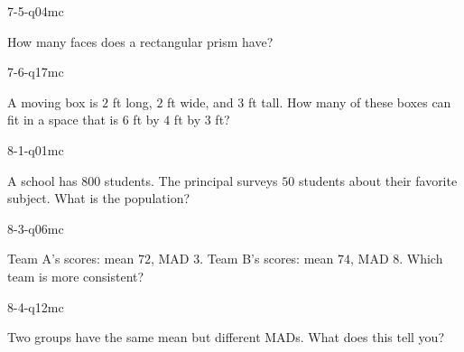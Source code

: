 \begin{practiceQuestion}{7-5-q04}{mc}
\begin{questionText}
How many faces does a rectangular prism have?
\end{questionText}
\end{practiceQuestion}

\begin{practiceQuestion}{7-6-q17}{mc}
\begin{questionText}
A moving box is $2$ ft long, $2$ ft wide, and $3$ ft tall. How many of these boxes can fit in a space that is $6$ ft by $4$ ft by $3$ ft?
\end{questionText}
\end{practiceQuestion}

\begin{practiceQuestion}{8-1-q01}{mc}
\begin{questionText}
A school has $800$ students. The principal surveys $50$ students about their favorite subject. What is the population?
\end{questionText}
\end{practiceQuestion}

\begin{practiceQuestion}{8-3-q06}{mc}
\begin{questionText}
Team A's scores: mean $72$, MAD $3$. Team B's scores: mean $74$, MAD $8$. Which team is more consistent?
\end{questionText}
\end{practiceQuestion}

\begin{practiceQuestion}{8-4-q12}{mc}
\begin{questionText}
Two groups have the same mean but different MADs. What does this tell you?
\end{questionText}
\end{practiceQuestion}

